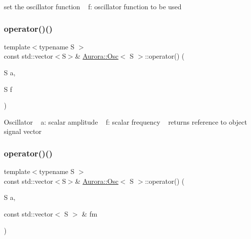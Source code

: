 set the oscillator function ~\newline
f\+: oscillator function to be used \mbox{\label{class_aurora_1_1_osc_a2a36c0afda86b6fabad4ed3ca0f510af}} 
\subsubsection{\texorpdfstring{operator()()}{operator()()}\hspace{0.1cm}{\footnotesize\ttfamily [1/6]}}
{\footnotesize\ttfamily template$<$typename S $>$ \\
const std\+::vector$<$S$>$\& \hyperlink{class_aurora_1_1_osc}{Aurora\+::\+Osc}$<$ S $>$\+::operator() (\begin{DoxyParamCaption}\item[{S}]{a,  }\item[{S}]{f }\end{DoxyParamCaption})\hspace{0.3cm}{\ttfamily [inline]}}

Oscillator ~\newline
a\+: scalar amplitude ~\newline
f\+: scalar frequency ~\newline
returns reference to object signal vector \mbox{\label{class_aurora_1_1_osc_af48611ef63363221de325d8976a1ec56}} 
\subsubsection{\texorpdfstring{operator()()}{operator()()}\hspace{0.1cm}{\footnotesize\ttfamily [2/6]}}
{\footnotesize\ttfamily template$<$typename S $>$ \\
const std\+::vector$<$S$>$\& \hyperlink{class_aurora_1_1_osc}{Aurora\+::\+Osc}$<$ S $>$\+::operator() (\begin{DoxyParamCaption}\item[{S}]{a,  }\item[{const std\+::vector$<$ S $>$ \&}]{fm }\end{DoxyParamCaption})\hspace{0.3cm}{\ttfamily [inline]}}

